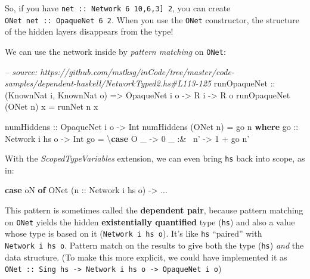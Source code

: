 \documentclass[]{article}
\newenvironment{Shaded}{}{}
\newcommand{\KeywordTok}[1]{\textcolor[rgb]{0.00,0.44,0.13}{\textbf{{#1}}}}
\newcommand{\DataTypeTok}[1]{\textcolor[rgb]{0.56,0.13,0.00}{{#1}}}
\newcommand{\DecValTok}[1]{\textcolor[rgb]{0.25,0.63,0.44}{{#1}}}
\newcommand{\CommentTok}[1]{\textcolor[rgb]{0.38,0.63,0.69}{\textit{{#1}}}}
\newcommand{\OtherTok}[1]{\textcolor[rgb]{0.00,0.44,0.13}{{#1}}}
\newcommand{\FunctionTok}[1]{\textcolor[rgb]{0.02,0.16,0.49}{{#1}}}
\newcommand{\NormalTok}[1]{{#1}}
\begin{document}
So, if you have \texttt{net\ ::\ Network\ 6\ \textquotesingle{}{[}10,6,3{]}\ 2},
you can create \texttt{ONet\ net\ ::\ OpaqueNet\ 6\ 2}. When you use the
\texttt{ONet} constructor, the structure of the hidden layers disappears from
the type!

We can use the network inside by \emph{pattern matching} on \texttt{ONet}:

\begin{Shaded}
\begin{Highlighting}[]
\CommentTok{-- source: https://github.com/mstksg/inCode/tree/master/code-samples/dependent-haskell/NetworkTyped2.hs#L113-125}
\OtherTok{runOpaqueNet ::} \NormalTok{(}\DataTypeTok{KnownNat} \NormalTok{i, }\DataTypeTok{KnownNat} \NormalTok{o)}
             \OtherTok{=>} \DataTypeTok{OpaqueNet} \NormalTok{i o}
             \OtherTok{->} \DataTypeTok{R} \NormalTok{i}
             \OtherTok{->} \DataTypeTok{R} \NormalTok{o}
\NormalTok{runOpaqueNet (}\DataTypeTok{ONet} \NormalTok{n) x }\FunctionTok{=} \NormalTok{runNet n x}

\OtherTok{numHiddens ::} \DataTypeTok{OpaqueNet} \NormalTok{i o }\OtherTok{->} \DataTypeTok{Int}
\NormalTok{numHiddens (}\DataTypeTok{ONet} \NormalTok{n) }\FunctionTok{=} \NormalTok{go n}
  \KeywordTok{where}
\OtherTok{    go ::} \DataTypeTok{Network} \NormalTok{i hs o }\OtherTok{->} \DataTypeTok{Int}
    \NormalTok{go }\FunctionTok{=} \NormalTok{\textbackslash{}}\KeywordTok{case}
        \DataTypeTok{O} \NormalTok{_      }\OtherTok{->} \DecValTok{0}
        \NormalTok{_ }\FunctionTok{:&~} \NormalTok{n' }\OtherTok{->} \DecValTok{1} \FunctionTok{+} \NormalTok{go n'}
\end{Highlighting}
\end{Shaded}

With the \emph{ScopedTypeVariables} extension, we can even bring \texttt{hs}
back into scope, as in:

\begin{Shaded}
\begin{Highlighting}[]
\KeywordTok{case} \NormalTok{oN }\KeywordTok{of}
  \DataTypeTok{ONet} \NormalTok{(}\OtherTok{n ::} \DataTypeTok{Network} \NormalTok{i hs o) }\OtherTok{->} \FunctionTok{...}
\end{Highlighting}
\end{Shaded}

This pattern is sometimes called the \textbf{dependent pair}, because pattern
matching on \texttt{ONet} yields the hidden \textbf{existentially quantified}
type (\texttt{hs}) and also a value whose type is based on it
(\texttt{Network\ i\ hs\ o}). It's like \texttt{hs} ``paired'' with
\texttt{Network\ i\ hs\ o}. Pattern match on the results to give both the type
(\texttt{hs}) \emph{and} the data structure. (To make this more explicit, we
could have implemented it as
\texttt{ONet\ ::\ Sing\ hs\ -\textgreater{}\ Network\ i\ hs\ o\ -\textgreater{}\ OpaqueNet\ i\ o})
\end{document}
